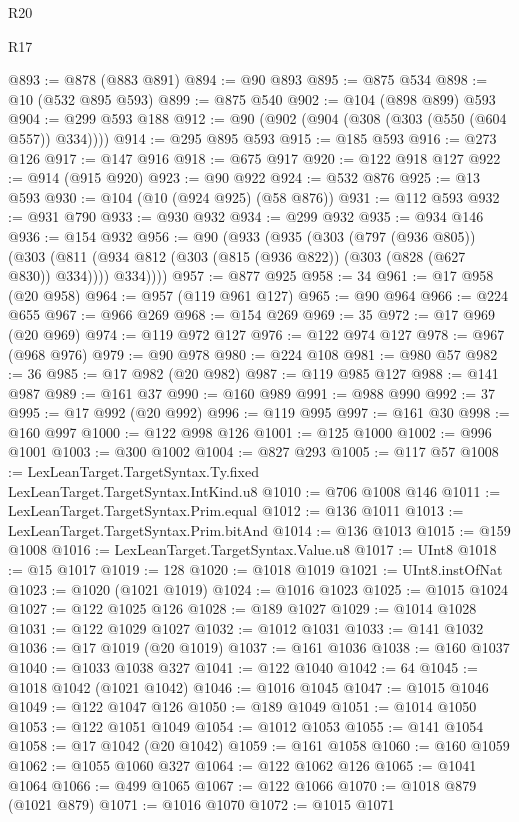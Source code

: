 \begin{lexlean}{R20}
\begin{lexlean}{R17}
\begin{coremodule}
{{{{{{{{{{{{{{{{{{{{{{{{{{{{{{{{{{{{{{{{{{{{{{{{{{{{{{{{{{{{{{{{{{{{{{{{{{{{{{{{{{{{{{{{{{{{{{{{{{{{{{{{{{{@893 := @878 (@883 @891)
@894 := @90 @893
@895 := @875 @534
@898 := @10 (@532 @895 @593)
@899 := @875 @540
@902 := @104 (@898 @899) @593
@904 := @299 @593 @188
@912 := @90 (@902 (@904 (@308 (@303 (@550 (@604 @557)) @334))))
@914 := @295 @895 @593
@915 := @185 @593
@916 := @273 @126
@917 := @147 @916
@918 := @675 @917
@920 := @122 @918 @127
@922 := @914 (@915 @920)
@923 := @90 @922
@924 := @532 @876
@925 := @13 @593
@930 := @104 (@10 (@924 @925) (@58 @876))
@931 := @112 @593
@932 := @931 @790
@933 := @930 @932
@934 := @299 @932
@935 := @934 @146
@936 := @154 @932
@956 := @90
    (@933
      (@935
        (@303
          (@797 (@936 @805))
          (@303 (@811 (@934 @812 (@303 (@815 (@936 @822)) (@303 (@828 (@627 @830)) @334)))) @334))))
@957 := @877 @925
@958 := 34
@961 := @17 @958 (@20 @958)
@964 := @957 (@119 @961 @127)
@965 := @90 @964
@966 := @224 @655
@967 := @966 @269
@968 := @154 @269
@969 := 35
@972 := @17 @969 (@20 @969)
@974 := @119 @972 @127
@976 := @122 @974 @127
@978 := @967 (@968 @976)
@979 := @90 @978
@980 := @224 @108
@981 := @980 @57
@982 := 36
@985 := @17 @982 (@20 @982)
@987 := @119 @985 @127
@988 := @141 @987
@989 := @161 @37
@990 := @160 @989
@991 := @988 @990
@992 := 37
@995 := @17 @992 (@20 @992)
@996 := @119 @995
@997 := @161 @30
@998 := @160 @997
@1000 := @122 @998 @126
@1001 := @125 @1000
@1002 := @996 @1001
@1003 := @300 @1002
@1004 := @827 @293
@1005 := @117 @57
@1008 := LexLeanTarget.TargetSyntax.Ty.fixed LexLeanTarget.TargetSyntax.IntKind.u8
@1010 := @706 @1008 @146
@1011 := LexLeanTarget.TargetSyntax.Prim.equal
@1012 := @136 @1011
@1013 := LexLeanTarget.TargetSyntax.Prim.bitAnd
@1014 := @136 @1013
@1015 := @159 @1008
@1016 := LexLeanTarget.TargetSyntax.Value.u8
@1017 := UInt8
@1018 := @15 @1017
@1019 := 128
@1020 := @1018 @1019
@1021 := UInt8.instOfNat
@1023 := @1020 (@1021 @1019)
@1024 := @1016 @1023
@1025 := @1015 @1024
@1027 := @122 @1025 @126
@1028 := @189 @1027
@1029 := @1014 @1028
@1031 := @122 @1029 @1027
@1032 := @1012 @1031
@1033 := @141 @1032
@1036 := @17 @1019 (@20 @1019)
@1037 := @161 @1036
@1038 := @160 @1037
@1040 := @1033 @1038 @327
@1041 := @122 @1040
@1042 := 64
@1045 := @1018 @1042 (@1021 @1042)
@1046 := @1016 @1045
@1047 := @1015 @1046
@1049 := @122 @1047 @126
@1050 := @189 @1049
@1051 := @1014 @1050
@1053 := @122 @1051 @1049
@1054 := @1012 @1053
@1055 := @141 @1054
@1058 := @17 @1042 (@20 @1042)
@1059 := @161 @1058
@1060 := @160 @1059
@1062 := @1055 @1060 @327
@1064 := @122 @1062 @126
@1065 := @1041 @1064
@1066 := @499 @1065
@1067 := @122 @1066
@1070 := @1018 @879 (@1021 @879)
@1071 := @1016 @1070
@1072 := @1015 @1071
}}}}}}}}}}}}}}}}}}}}}}}}}}}}}}}}}}}}}}}}}}}}}}}}}}}}}}}}}}}}}}}}}}}}}}}}}}}}}}}}}}}}}}}}}}}}}}}}}}}}}}}}}}}
\end{coremodule}
\end{lexlean}
\end{lexlean}
